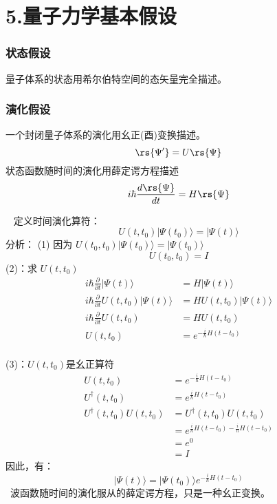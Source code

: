 \section{5.量子力学基本假设}

\begin{frame}
    \frametitle{状态假设}
    \begin{tcolorbox4}[1. 状态假设]
    量子体系的状态用希尔伯特空间的态矢量完全描述。
    \end{tcolorbox4}
\end{frame}


\begin{frame}
    \frametitle{演化假设}
    \begin{tcolorbox4}[2. 演化假设]
    一个封闭量子体系的演化用幺正(酉)变换描述。
    \[\rs{\Psi'}=U\rs{\Psi}\]
    状态函数随时间的演化用薛定谔方程描述
    \[ i\hbar \frac{d\rs{\Psi}}{dt}=H \rs{\Psi}\]
    \end{tcolorbox4}
\end{frame}

\begin{frame}
    \例[8. 试证明薛定谔方程与酉变换等价]{}
    \证~ 定义时间演化算符：
    $$ U(t,t_0) |\Psi(t_0)\rangle = |\Psi(t)\rangle  $$
    \alert{分析}：
    (1) 因为 $ U(t_0,t_0) |\Psi(t_0)\rangle = |\Psi(t_0)\rangle  $ \\
    $$ U(t_0,t_0)=I $$
    (2)：求 $ U(t,t_0)$
    $$ \begin{aligned}
        i\hbar \frac{\partial }{\partial t} |\Psi(t)\rangle &= H|\Psi(t)\rangle  \\
        i\hbar \frac{\partial }{\partial t}  U(t,t_0) |\Psi(t)\rangle &= H U(t,t_0) |\Psi(t)\rangle  \\
        i\hbar \frac{\partial }{\partial t}  U(t,t_0)  &= H U(t,t_0)  \\
        U(t,t_0)  &= e^{-\frac{i}{\hbar} H(t-t_0)}  \\
    \end{aligned} $$
\end{frame}

\begin{frame}  
    (3)：$ U(t,t_0)$是幺正算符
    $$ \begin{aligned}
        U(t,t_0)  &= e^{-\frac{i}{\hbar} H(t-t_0)}  \\
        U^\dagger (t,t_0)  &= e^{\frac{i}{\hbar} H(t-t_0)}  \\
        U^\dagger (t,t_0)U(t,t_0) &= U^\dagger (t,t_0)U(t,t_0) \\
         &=e^{\frac{i}{\hbar} H(t-t_0)-\frac{i}{\hbar} H(t-t_0)} \\
         &=e^0 \\
         &=I
    \end{aligned} $$
    因此，有：
    $$ |\Psi(t)\rangle = |\Psi(t_0)\rangle e^{-\frac{i}{\hbar}H(t-t_0)}   $$
    \Note ~波函数随时间的演化服从的薛定谔方程，只是一种幺正变换。
\end{frame} 

